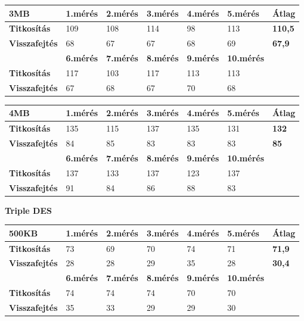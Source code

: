 \begin{center}
	
	
	\begin{tabular}{|p{2.4cm}|p{1.7cm}|p{1.7cm}|p{1.7cm}|p{1.7cm}|p{1.8cm}|p{1.2cm}|}
		\hline
		\textbf{3MB} & \textbf{1.mérés} & \textbf{2.mérés} & \textbf{3.mérés} & \textbf{4.mérés} & \textbf{5.mérés} & \textbf{Átlag} \\
		\hline
		\textbf{Titkosítás}&109&108&114&98&113&\textbf{110,5}\\
		\hline
		\textbf{Visszafejtés}&68&67&67&68&69&\textbf{67,9}\\
		\hline
		& \textbf{6.mérés} & \textbf{7.mérés} & \textbf{8.mérés} & \textbf{9.mérés} & \textbf{10.mérés} & \\
		\hline
		\textbf{Titkosítás}&117&103&117&113&113& \\
		\hline
		\textbf{Visszafejtés}&67&68&67&70&68& \\
		\hline
	\end{tabular}
\end{center}

\begin{center}
	
	
	\begin{tabular}{|p{2.4cm}|p{1.7cm}|p{1.7cm}|p{1.7cm}|p{1.7cm}|p{1.8cm}|p{1.2cm}|}
		\hline
		\textbf{4MB} & \textbf{1.mérés} & \textbf{2.mérés} & \textbf{3.mérés} & \textbf{4.mérés} & \textbf{5.mérés} & \textbf{Átlag} \\
		\hline
		\textbf{Titkosítás}&135&115&137&135&131&\textbf{132} \\
		\hline
		\textbf{Visszafejtés}&84&85&83&83&83&\textbf{85} \\
		\hline
		& \textbf{6.mérés} & \textbf{7.mérés} & \textbf{8.mérés} & \textbf{9.mérés} & \textbf{10.mérés} & \\
		\hline
		\textbf{Titkosítás}&137&133&137&123&137&\\
		\hline
		\textbf{Visszafejtés}&91&84&86&88&83& \\
		\hline
	\end{tabular}
\end{center}

\newpage \noindent \textbf{Triple DES}

\begin{center}
	
	
	\begin{tabular}{|p{2.4cm}|p{1.7cm}|p{1.7cm}|p{1.7cm}|p{1.7cm}|p{1.8cm}|p{1.2cm}|}
		\hline
		\textbf{500KB} & \textbf{1.mérés} & \textbf{2.mérés} & \textbf{3.mérés} & \textbf{4.mérés} & \textbf{5.mérés} & \textbf{Átlag} \\
		\hline
		\textbf{Titkosítás}&73&69&70&74&71&\textbf{71,9} \\
		\hline
		\textbf{Visszafejtés}&28&28&29&35&28&\textbf{30,4} \\
		\hline
		& \textbf{6.mérés} & \textbf{7.mérés} & \textbf{8.mérés} & \textbf{9.mérés} & \textbf{10.mérés} & \\
		\hline
		\textbf{Titkosítás}&74&74&74&70&70&\\
		\hline
		\textbf{Visszafejtés}&35&33&29&29&30&\\
		\hline
	\end{tabular}
\end{center}

